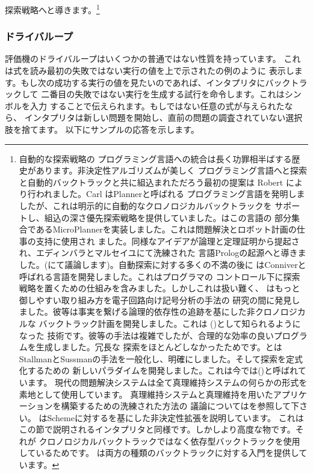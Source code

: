 探索戦略へと導きます。\footnote{自動的な探索戦略の
プログラミング言語への統合は長く功罪相半ばする歴史があります。非決定性アルゴリズムが美しく
プログラミング言語へと探索と自動的バックトラックと共に組込まれただろう最初の提案は
Robert により行われました。Carl はPlannerと呼ばれる
プログラミング言語を発明しましたが、これは明示的に自動的なクロノロジカルバックトラックを
サポートし、組込の深さ優先探索戦略を提供していました。はこの言語の
部分集合であるMicroPlannerを実装しました。これは問題解決とロボット計画の仕事の支持に使用され
ました。同様なアイデアが論理と定理証明から提起され、エディンバラとマルセイユにて洗練された
言語Prologの起源へと導きました。(にて議論します)。自動探索に対する多くの不満の後に
はConniverと呼ばれる言語を開発しました。これはプログラマの
コントロール下に探索戦略を置くための仕組みを含みました。しかしこれは扱い難く、
はもっと御しやすい取り組み方を電子回路向け記号分析の手法の
研究の間に発見しました。彼等は事実を繋げる論理的依存性の追跡を基にした非クロノロジカルな
バックトラック計画を開発しました。これは
()として知られるようになった
技術です。彼等の手法は複雑でしたが、合理的な効率の良いプログラムを生成しました。冗長な
探索をほとんどしなかったためです。とは
StallmanとSussmanの手法を一般化し、明確にしました。そして探索を定式化するための
新しいパラダイムを開発しました。これは今では()と呼ばれています。
現代の問題解決システムは全て真理維持システムの何らかの形式を素地として使用しています。
真理維持システムと真理維持を用いたアプリケーションを構築するための洗練された方法の
議論についてはを参照して下さい。
はSchemeに対するを基にした非決定性拡張を説明しています。
これはこの節で説明されるインタプリタと同様です。しかしより高度な物です。それが
クロノロジカルバックトラックではなく依存型バックトラックを使用しているためです。
は両方の種類のバックトラックに対する入門を提供しています。}

\subsubsection*{ドライバループ}

評価機のドライバループはいくつかの普通ではない性質を持っています。
これは式を読み最初の失敗ではない実行の値を上で示されたの例のように
表示します。もし次の成功する実行の値を見たいのであれば、インタプリタにバックトラックして
二番目の失敗ではない実行を生成する試行を命令します。これはシンボルを入力
することで伝えられます。もしではない任意の式が与えられたなら、
インタプリタは新しい問題を開始し、直前の問題の調査されていない選択肢を捨てます。
以下にサンプルの応答を示します。

